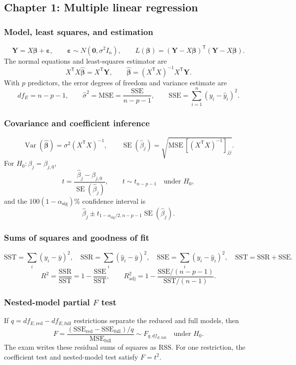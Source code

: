 \documentclass[11pt]{article}
\newcommand{\trans}{\mathsf T}
\newcommand{\Var}{\operatorname{Var}}
\newcommand{\SE}{\operatorname{SE}}
\begin{document}
\subsection{Chapter 1: Multiple linear regression}

\subsubsection*{Model, least squares, and estimation}
\[
\bm Y=X\bm\beta+\bm\varepsilon,
\qquad
\bm\varepsilon\sim N(\bm0,\sigma^2I_n),
\qquad
L(\bm\beta)=(\bm Y-X\bm\beta)^\trans(\bm Y-X\bm\beta).
\]
The normal equations and least-squares estimator are
\[
X^\trans X\hat{\bm\beta}=X^\trans\bm Y,
\qquad
\hat{\bm\beta}=(X^\trans X)^{-1}X^\trans\bm Y.
\]
With \(p\) predictors, the error degrees of freedom and variance estimate are
\[
df_E=n-p-1,
\qquad
\hat\sigma^2=\mathrm{MSE}
=\frac{\mathrm{SSE}}{n-p-1},
\qquad
\mathrm{SSE}=\sum_{i=1}^n(y_i-\hat y_i)^2.
\]

\subsubsection*{Covariance and coefficient inference}
\[
\Var(\hat{\bm\beta})=\sigma^2(X^\trans X)^{-1},
\qquad
\SE(\hat\beta_j)
=\sqrt{\mathrm{MSE}\,[(X^\trans X)^{-1}]_{jj}}.
\]
For \(H_0:\beta_j=\beta_{j,0}\),
\[
t=\frac{\hat\beta_j-\beta_{j,0}}{\SE(\hat\beta_j)},
\qquad t\sim t_{n-p-1}\quad\text{under }H_0,
\]
and the \(100(1-\alpha_{\mathrm{sig}})\%\) confidence interval is
\[
\hat\beta_j\pm t_{1-\alpha_{\mathrm{sig}}/2,n-p-1}\SE(\hat\beta_j).
\]

\subsubsection*{Sums of squares and goodness of fit}
\[
\mathrm{SST}=\sum_i(y_i-\bar y)^2,
\quad
\mathrm{SSR}=\sum_i(\hat y_i-\bar y)^2,
\quad
\mathrm{SSE}=\sum_i(y_i-\hat y_i)^2,
\quad
\mathrm{SST}=\mathrm{SSR}+\mathrm{SSE}.
\]
\[
R^2=\frac{\mathrm{SSR}}{\mathrm{SST}}
=1-\frac{\mathrm{SSE}}{\mathrm{SST}},
\qquad
R_{\mathrm{adj}}^2
=1-\frac{\mathrm{SSE}/(n-p-1)}{\mathrm{SST}/(n-1)}.
\]

\subsubsection*{Nested-model partial \(F\) test}
If \(q=df_{E,\mathrm{red}}-df_{E,\mathrm{full}}\) restrictions separate the
reduced and full models, then
\[
F=\frac{(\mathrm{SSE}_{\mathrm{red}}-
                 \mathrm{SSE}_{\mathrm{full}})/q}
        {\mathrm{MSE}_{\mathrm{full}}}
\sim F_{q,df_{E,\mathrm{full}}}\quad\text{under }H_0.
\]
The exam writes these residual sums of squares as \(\mathrm{RSS}\). For one
restriction, the coefficient test and nested-model test satisfy \(F=t^2\).
\end{document}
